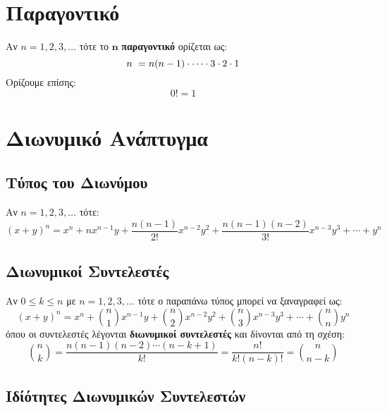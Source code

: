 

\section{Παραγοντικό}

Αν $n=1,2,3,\ldots$ τότε το $\bm{n}$ \textbf{\color{blue} παραγοντικό} ορίζεται ως:
\[
n~=n(n-1)\cdot\cdots\cdot3\cdot 2\cdot 1 \\
\]
Ορίζουμε επίσης:
\[
0!=1
\]

\section{Διωνυμικό Ανάπτυγμα}

\subsection{Τύπος του Διωνύμου}

Αν $n=1,2,3,\ldots$ τότε:
\[
(x+y)^{n}=x^{n}+nx^{n-1}y+\frac{n(n-1)}{2!}x^{n-2}y^{2}+\frac{n(n-1)(n-2)}{3!}x^{n-3}y^3+\cdots+y^{n}
\]

\subsection{Διωνυμικοί Συντελεστές}

Αν $0\leq k\leq n$ με $n=1,2,3,\ldots$ τότε ο παραπάνω τύπος μπορεί να ξαναγραφεί ως:
\[
(x+y)^{n}=x^{n}+\binom{n}{1}x^{n-1}y+\binom{n}{2}x^{n-2}y^{2}+\binom{n}{3}x^{n-3}y^{3}+\cdots+\binom{n}{n}y^{n}
\]
όπου οι συντελεστές λέγονται \textbf{\color{blue} διωνυμικοί συντελεστές} και δίνονται από τη σχέση:
\[
\binom{n}{k}=\frac{n(n-1)(n-2)\cdots(n-k+1)}{k!}=\frac{n!}{k!(n-k)!}=\binom{n}{n-k}
\]

\subsection{Ιδίότητες Διωνυμικών Συντελεστών}

